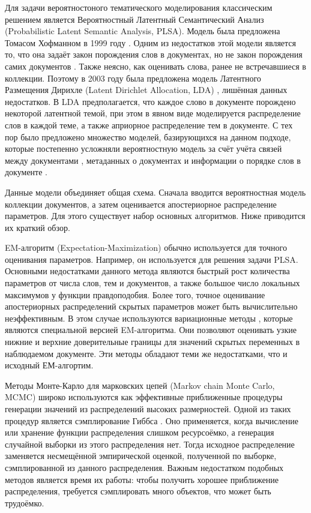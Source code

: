 \documentclass[12pt]{article}
\begin{document}
Для  задачи вероятностоного тематического моделирования  классическим решением является Вероятностный Латентный Семантический Анализ (Probabilistic Latent Semantic Analysis, PLSA). Модель  была предложена Томасом Хофманном в 1999 году \cite{plsadef2}. Одним из недостатков этой модели является то, что она задаёт закон порождения слов в документах, но не закон порождения самих документов \cite{plsaminus}. Также  неясно, как оценивать слова, ранее не встречавшиеся в коллекции. Поэтому в 2003 году была предложена модель Латентного Размещения Дирихле (Latent Dirichlet Allocation, LDA) \cite{ldadef1}, лишённая данных недостатков. В LDA предполагается, что каждое слово в документе порождено некоторой латентной темой, при этом в явном виде моделируется распределение слов в каждой теме, а также априорное
распределение тем в документе. С тех пор было предложено множество моделей, базирующихся на данном подходе, которые постепенно усложняли вероятностную модель за счёт учёта связей между документами \cite{connect1, connect2, connect3}, метаданных о документах \cite{metadata} и информации о порядке слов в документе \cite{order1, order2}.

Данные модели объединяет общая схема. Сначала вводится вероятностная модель коллекции документов, а затем оценивается  апостериорное распределение  параметров. Для этого существует набор основных алгоритмов. Ниже приводится их краткий обзор.

EM-алгоритм (Expectation-Maximization) \cite{baseem} обычно используется для  точного оценивания параметров. Например, он используется для решения задачи PLSA. Основными недостатками данного метода являются быстрый рост количества параметров от числа слов, тем и документов, а также большое число локальных максимумов у функции правдоподобия. Более того, точное оценивание апостериорных распределений скрытых параметров может быть вычислительно неэффективным. В этом случае используются вариационные методы \cite{basevar}, которые являются специальной версией EM-алгоритма. Они  позволяют оценивать узкие нижние и верхние доверительные границы для значений скрытых переменных в наблюдаемом документе. Эти методы обладают теми же недостатками, что и исходный ЕМ-алгортим.

Методы Монте-Карло для марковских цепей (Markov chain Monte Carlo, MCMC) \cite{mcmc1, mcmc2} широко используются как эффективные приближенные процедуры генерации значений из распределений высоких размерностей. Одной из таких процедур является сэмплирование Гиббса \cite{gibbs}.  Оно применяется, когда вычисление или хранение функции распределения слишком ресурсоёмко, а генерация случайной выборки из этого распределения нет. Тогда исходное распределение заменяется несмещённой эмпирической оценкой, полученной по выборке, сэмплированной из данного распределения. Важным недостатком подобных методов является время их работы: чтобы получить хорошее приближение распределения, требуется сэмплировать много объектов, что может быть трудоёмко. 
\end{document}
